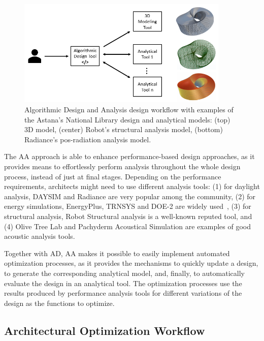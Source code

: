\begin{figure}[htbp]
\centering
\includegraphics[width=0.90\textwidth]{./Images/Introduction/AlgorithmicDesignAndAnalysis_w_models.png}
\caption[General view of the Algorithmic Design and Analysis design approach]{Algorithmic Design and Analysis design workflow with examples of the Astana's National Library design and analytical models: (top) 3D model, (center) Robot's structural analysis model, (bottom) Radiance's pos-radiation analysis model.}
\label{fig:algorithmicanalysis}
\end{figure}		
	

	The \ac{AA} approach is able to enhance performance-based design approaches, as it provides means to effortlessly perform analysis throughout the whole design process, instead of just at final stages. Depending on the performance requirements, architects might need to use different analysis tools: (1) for daylight analysis, DAYSIM and Radiance are very popular among the community, (2) for energy simulations, EnergyPlus, TRNSYS and DOE-2 are widely used~\cite{Nguyen2014}, (3) for structural analysis, Robot Structural analysis is a well-known reputed tool, and (4) Olive Tree Lab and Pachyderm Acoustical Simulation are examples of good acoustic analysis tools. 

	Together with \ac{AD}, \ac{AA} makes it possible to easily implement automated optimization processes, as it provides the mechanisms to quickly update a design, to generate the corresponding analytical model, and, finally, to automatically evaluate the design in an analytical tool. The optimization processes use the results produced by performance analysis tools for different variations of the design as the functions to optimize. 
	
\subsection{Architectural Optimization Workflow}

